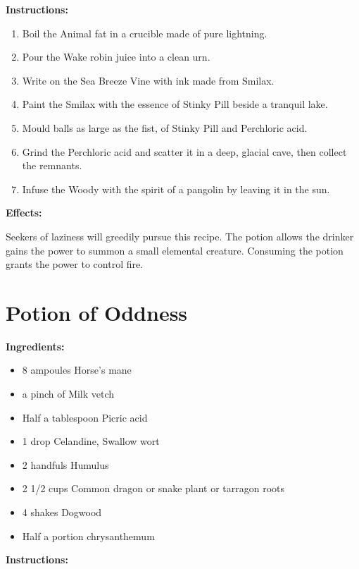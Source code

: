 \documentclass{article}
\begin{document}
\textbf{Instructions:}

\begin{enumerate}
  \item Boil the Animal fat in a crucible made of pure lightning.
  \item Pour the Wake robin juice into a clean urn.
  \item Write on the Sea Breeze Vine with ink made from Smilax.
  \item Paint the Smilax with the essence of Stinky Pill beside a tranquil lake.
  \item Mould balls as large as the fist, of Stinky Pill and Perchloric acid.
  \item Grind the Perchloric acid and scatter it in a deep, glacial cave, then collect the remnants.
  \item Infuse the Woody with the spirit of a pangolin by leaving it in the sun.
\end{enumerate}

\textbf{Effects:}

Seekers of laziness will greedily pursue this recipe. The potion allows the drinker gains the power to summon a small elemental creature. Consuming the potion grants the power to control fire.

\newpage
\section*{Potion of Oddness}

\textbf{Ingredients:}

\begin{itemize}
  \item 8 ampoules Horse's mane
  \item a pinch of Milk vetch
  \item Half a tablespoon Picric acid
  \item 1 drop Celandine, Swallow wort
  \item 2 handfuls Humulus
  \item 2 1/2 cups Common dragon or snake plant or tarragon roots
  \item 4 shakes Dogwood
  \item Half a portion chrysanthemum
\end{itemize}

\textbf{Instructions:}
\end{document}
